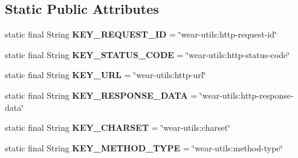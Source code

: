 \subsection*{Static Public Attributes}
\begin{DoxyCompactItemize}
\item 
static final String {\bfseries K\+E\+Y\+\_\+\+R\+E\+Q\+U\+E\+S\+T\+\_\+\+ID} = \char`\"{}wear-\/utils\+:http-\/request-\/id\char`\"{}\hypertarget{classcom_1_1google_1_1devrel_1_1wcl_1_1connectivity_1_1WearHttpHelper_a688ac8562276ad99be01f53a470bb6ec}{}\label{classcom_1_1google_1_1devrel_1_1wcl_1_1connectivity_1_1WearHttpHelper_a688ac8562276ad99be01f53a470bb6ec}

\item 
static final String {\bfseries K\+E\+Y\+\_\+\+S\+T\+A\+T\+U\+S\+\_\+\+C\+O\+DE} = \char`\"{}wear-\/utils\+:http-\/status-\/code\char`\"{}\hypertarget{classcom_1_1google_1_1devrel_1_1wcl_1_1connectivity_1_1WearHttpHelper_a4dcd3e551197530250ee4df3d2c3d036}{}\label{classcom_1_1google_1_1devrel_1_1wcl_1_1connectivity_1_1WearHttpHelper_a4dcd3e551197530250ee4df3d2c3d036}

\item 
static final String {\bfseries K\+E\+Y\+\_\+\+U\+RL} = \char`\"{}wear-\/utils\+:http-\/url\char`\"{}\hypertarget{classcom_1_1google_1_1devrel_1_1wcl_1_1connectivity_1_1WearHttpHelper_a3a39ee7fce35e472ac5a25a572b63392}{}\label{classcom_1_1google_1_1devrel_1_1wcl_1_1connectivity_1_1WearHttpHelper_a3a39ee7fce35e472ac5a25a572b63392}

\item 
static final String {\bfseries K\+E\+Y\+\_\+\+R\+E\+S\+P\+O\+N\+S\+E\+\_\+\+D\+A\+TA} = \char`\"{}wear-\/utils\+:http-\/response-\/data\char`\"{}\hypertarget{classcom_1_1google_1_1devrel_1_1wcl_1_1connectivity_1_1WearHttpHelper_a6d67f71cf8ca67b06c3b9144eae64dce}{}\label{classcom_1_1google_1_1devrel_1_1wcl_1_1connectivity_1_1WearHttpHelper_a6d67f71cf8ca67b06c3b9144eae64dce}

\item 
static final String {\bfseries K\+E\+Y\+\_\+\+C\+H\+A\+R\+S\+ET} = \char`\"{}wear-\/utils\+:charset\char`\"{}\hypertarget{classcom_1_1google_1_1devrel_1_1wcl_1_1connectivity_1_1WearHttpHelper_a5aaa3655f78d21385d3e4a93fc0cfdf1}{}\label{classcom_1_1google_1_1devrel_1_1wcl_1_1connectivity_1_1WearHttpHelper_a5aaa3655f78d21385d3e4a93fc0cfdf1}

\item 
static final String {\bfseries K\+E\+Y\+\_\+\+M\+E\+T\+H\+O\+D\+\_\+\+T\+Y\+PE} = \char`\"{}wear-\/utils\+:method-\/type\char`\"{}\hypertarget{classcom_1_1google_1_1devrel_1_1wcl_1_1connectivity_1_1WearHttpHelper_af65772c7e6387329463e345f4f2fb1c2}{}\label{classcom_1_1google_1_1devrel_1_1wcl_1_1connectivity_1_1WearHttpHelper_af65772c7e6387329463e345f4f2fb1c2}


\end{DoxyCompactItemize}
